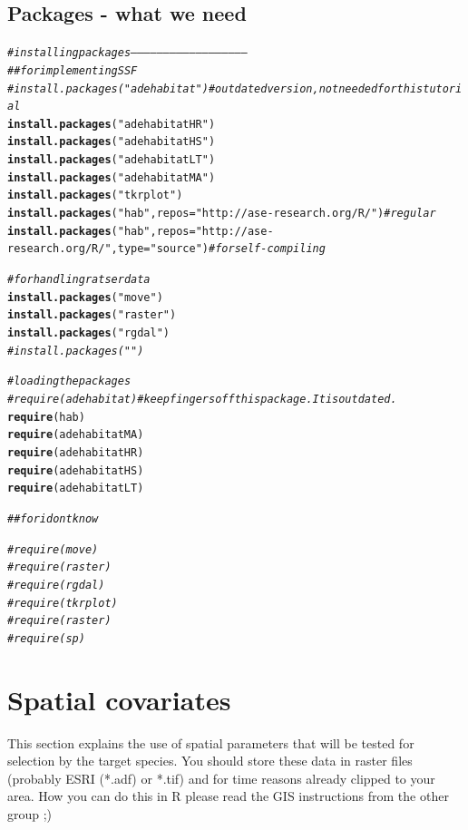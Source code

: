 \documentclass[11pt, a4paper]{article}\usepackage[]{graphicx}\usepackage[]{color}
\makeatletter
\newcommand{\hlstr}[1]{\textcolor[rgb]{0.192,0.494,0.8}{#1}}%
\newcommand{\hlcom}[1]{\textcolor[rgb]{0.678,0.584,0.686}{\textit{#1}}}%
\newcommand{\hlstd}[1]{\textcolor[rgb]{0.345,0.345,0.345}{#1}}%
\newcommand{\hlkwc}[1]{\textcolor[rgb]{0.333,0.667,0.333}{#1}}%
\newcommand{\hlkwd}[1]{\textcolor[rgb]{0.737,0.353,0.396}{\textbf{#1}}}%
\newenvironment{kframe}{%
 \def\at@end@of@kframe{}%
 \ifinner\ifhmode%
  \def\at@end@of@kframe{\end{minipage}}%
  \begin{minipage}{\columnwidth}%
 \fi\fi%
 \def\FrameCommand##1{\hskip\@totalleftmargin \hskip-\fboxsep
 \colorbox{shadecolor}{##1}\hskip-\fboxsep
     \hskip-\linewidth \hskip-\@totalleftmargin \hskip\columnwidth}%
 \MakeFramed {\advance\hsize-\width
   \@totalleftmargin\z@ \linewidth\hsize
   \@setminipage}}%
 {\par\unskip\endMakeFramed%
 \at@end@of@kframe}
\newenvironment{knitrout}{}{} %
\makeatother
\begin{document}
\subsection{Packages - what we need}

\begin{knitrout}
\color{fgcolor}\begin{kframe}
\begin{alltt}
\hlcom{# installing packages -----------------------------------------------------}
\hlcom{## for implementing SSF}
\hlcom{# install.packages("adehabitat") # outdated version, not needed for this tutorial}
\hlkwd{install.packages}\hlstd{(}\hlstr{"adehabitatHR"}\hlstd{)}
\hlkwd{install.packages}\hlstd{(}\hlstr{"adehabitatHS"}\hlstd{)}
\hlkwd{install.packages}\hlstd{(}\hlstr{"adehabitatLT"}\hlstd{)}
\hlkwd{install.packages}\hlstd{(}\hlstr{"adehabitatMA"}\hlstd{)}
\hlkwd{install.packages}\hlstd{(}\hlstr{"tkrplot"}\hlstd{)}
\hlkwd{install.packages}\hlstd{(}\hlstr{"hab"}\hlstd{,} \hlkwc{repos} \hlstd{=} \hlstr{"http://ase-research.org/R/"}\hlstd{)} \hlcom{# regular}
\hlkwd{install.packages}\hlstd{(}\hlstr{"hab"}\hlstd{,} \hlkwc{repos} \hlstd{=} \hlstr{"http://ase-research.org/R/"}\hlstd{,} \hlkwc{type} \hlstd{=} \hlstr{"source"}\hlstd{)} \hlcom{# for self-compiling}

\hlcom{# for handling ratser data}
\hlkwd{install.packages}\hlstd{(}\hlstr{"move"}\hlstd{)}
\hlkwd{install.packages}\hlstd{(}\hlstr{"raster"}\hlstd{)}
\hlkwd{install.packages}\hlstd{(}\hlstr{"rgdal"}\hlstd{)}
\hlcom{#install.packages("")}

\hlcom{# loading the packages}
\hlcom{# require(adehabitat) # keep fingers off this package. It is outdated.}
\hlkwd{require}\hlstd{(hab)}
\hlkwd{require}\hlstd{(adehabitatMA)}
\hlkwd{require}\hlstd{(adehabitatHR)}
\hlkwd{require}\hlstd{(adehabitatHS)}
\hlkwd{require}\hlstd{(adehabitatLT)}

\hlcom{## for i dont know}

\hlcom{#require(move)}
\hlcom{#require(raster)}
\hlcom{#require(rgdal)}
\hlcom{#require(tkrplot)}
\hlcom{#require(raster)}
\hlcom{#require(sp)}
\end{alltt}
\end{kframe}
\end{knitrout}

\section{Spatial covariates}%
This section explains the use of spatial parameters that will be tested for selection by the target species. You should store these data in raster files (probably ESRI (*.adf) or *.tif) and for time reasons already clipped to your area. How you can do this in R please read the GIS instructions from the other group ;)   
\end{document}
